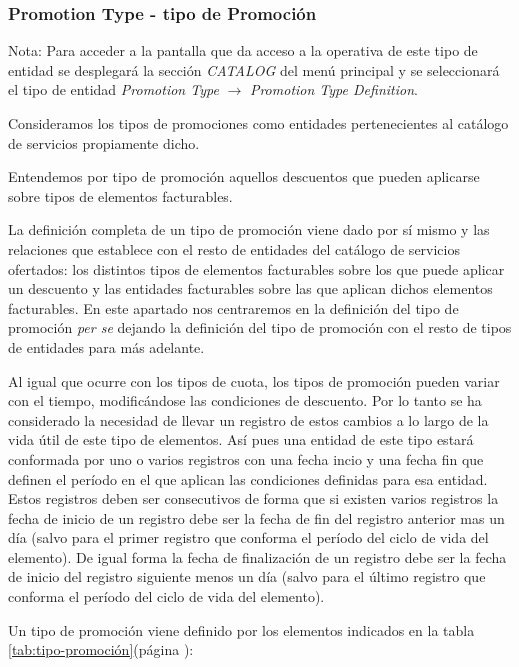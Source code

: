 \subsubsection{Promotion Type - tipo de Promoción}
\label{sub:promotion-type}

Nota: Para acceder a la pantalla que da acceso a la operativa de este tipo de entidad se desplegará la sección \emph{CATALOG} del menú principal y se seleccionará el tipo de entidad \emph{Promotion Type} $\rightarrow$  \emph{Promotion Type Definition}.

Consideramos los tipos de promociones como entidades pertenecientes al catálogo de servicios propiamente dicho.

Entendemos por tipo de promoción aquellos descuentos que pueden aplicarse sobre tipos de elementos facturables.

La definición completa de un tipo de promoción viene dado por sí mismo y las relaciones que establece con el resto de entidades del catálogo de servicios ofertados: los distintos tipos de elementos facturables sobre los que puede aplicar un descuento y las entidades facturables sobre las que aplican dichos elementos facturables.  En este apartado nos centraremos en la definición del tipo de promoción \textit{per se} dejando la definición del tipo de promoción con el resto de tipos de entidades para más adelante.

Al igual que ocurre con los tipos de cuota, los tipos de promoción pueden variar con el tiempo, modificándose las condiciones de descuento. Por lo tanto se ha considerado la necesidad de llevar un registro de estos cambios a lo largo de la vida útil de este tipo de elementos. Así pues una entidad de este tipo estará conformada por uno o varios registros con una fecha incio y una fecha fin que definen el período en el que aplican las condiciones definidas para esa entidad. Estos registros deben ser consecutivos de forma que si existen varios registros la fecha de inicio de un registro debe ser la fecha de fin del registro anterior mas un día (salvo para el primer registro que conforma el período del ciclo de vida del elemento). De igual forma la fecha de finalización de un registro debe ser la fecha de inicio del registro siguiente menos un día (salvo para el último registro que conforma el período del ciclo de vida del elemento).


Un tipo de promoción viene definido por los elementos indicados en la tabla \ref{tab:tipo-promoción}(página \pageref{tab:tipo-promoción}):


